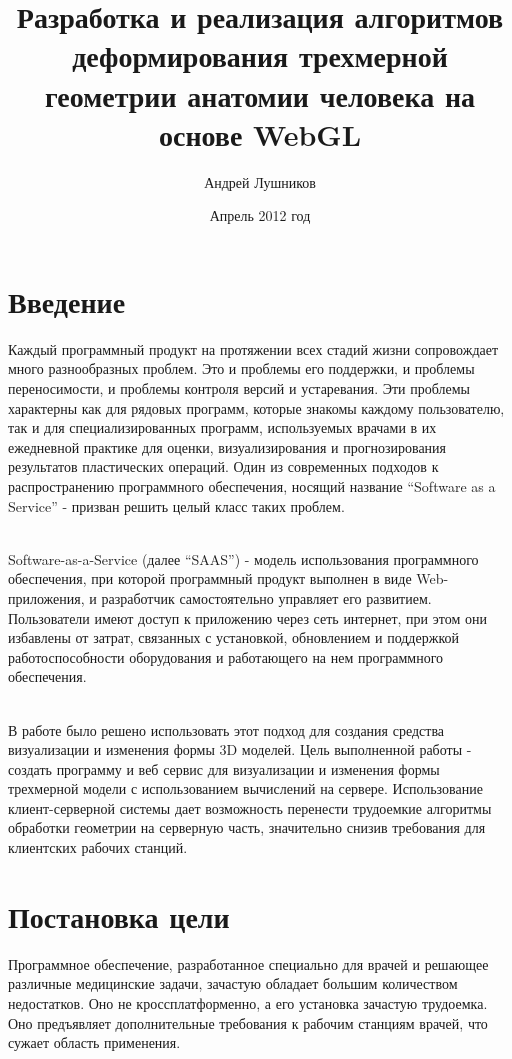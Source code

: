 \documentclass[12pt, a4paper]{article}
\author{Андрей Лушников}
\title{Разработка и реализация алгоритмов деформирования трехмерной геометрии анатомии человека на основе WebGL}
\date{Апрель 2012 год}
\let\stdsection\section
\renewcommand\section{\newpage\stdsection}
\begin{document}
\maketitle

\tableofcontents
\newpage

\section{Введение}
Каждый программный продукт на протяжении всех стадий жизни сопровождает много
разнообразных проблем. Это и проблемы его поддержки, и проблемы переносимости, и
проблемы контроля версий и устаревания. Эти проблемы характерны как для рядовых
программ, которые знакомы каждому пользователю, так и для специализированных
программ, используемых врачами в их ежедневной практике для оценки,
визуализирования и прогнозирования результатов пластических операций. Один из
современных подходов к распространению программного обеспечения, носящий
название ``Software as a Service'' - призван решить целый класс таких проблем.

\\
Software-as-a-Service (далее ``SAAS'') - модель использования программного
обеспечения, при которой программный продукт выполнен в виде Web-приложения, и
разработчик самостоятельно управляет его развитием. Пользователи имеют доступ к
приложению через сеть интернет, при этом они избавлены от затрат, связанных с
установкой, обновлением и поддержкой работоспособности оборудования и
работающего на нем программного обеспечения.

\\
В работе было решено использовать этот подход для создания средства визуализации
и изменения формы 3D моделей.  Цель выполненной работы - создать программу и веб
сервис для визуализации и изменения формы трехмерной модели с использованием
вычислений на сервере. Использование клиент-серверной системы дает возможность
перенести трудоемкие алгоритмы обработки геометрии на серверную часть,
значительно снизив требования для клиентских рабочих станций.

\section{Постановка цели}
Программное обеспечение, разработанное специально для врачей и решающее
различные медицинские задачи, зачастую обладает большим количеством недостатков.
Оно не кроссплатформенно, а его установка зачастую трудоемка. Оно предъявляет
дополнительные требования к рабочим станциям врачей, что сужает область
применения.
\end{document}
